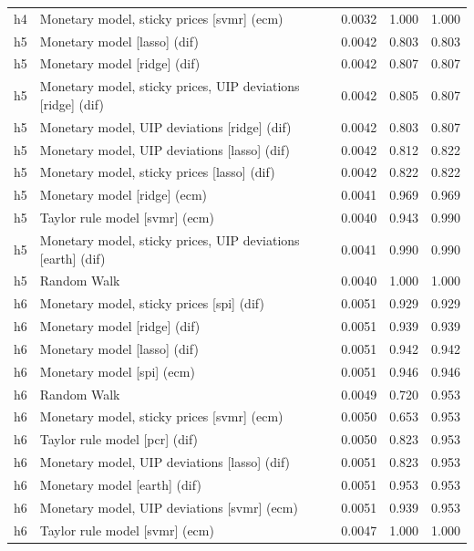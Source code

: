 \begin{ThreePartTable}
\begin{longtable}[t]{cp{5.5cm}ccc}
h4 & \raggedright Monetary model, sticky prices [svmr] (ecm) & 0.0032 & 1.000 & 1.000\\
\addlinespace
h5 & \raggedright Monetary model [lasso] (dif) & 0.0042 & 0.803 & 0.803\\
h5 & \raggedright Monetary model [ridge] (dif) & 0.0042 & 0.807 & 0.807\\
h5 & \raggedright Monetary model, sticky prices, UIP deviations [ridge] (dif) & 0.0042 & 0.805 & 0.807\\
h5 & \raggedright Monetary model, UIP deviations [ridge] (dif) & 0.0042 & 0.803 & 0.807\\
h5 & \raggedright Monetary model, UIP deviations [lasso] (dif) & 0.0042 & 0.812 & 0.822\\
h5 & \raggedright Monetary model, sticky prices [lasso] (dif) & 0.0042 & 0.822 & 0.822\\
h5 & \raggedright Monetary model [ridge] (ecm) & 0.0041 & 0.969 & 0.969\\
h5 & \raggedright Taylor rule model [svmr] (ecm) & 0.0040 & 0.943 & 0.990\\
h5 & \raggedright Monetary model, sticky prices, UIP deviations [earth] (dif) & 0.0041 & 0.990 & 0.990\\
h5 & \raggedright Random Walk & 0.0040 & 1.000 & 1.000\\
\addlinespace
h6 & \raggedright Monetary model, sticky prices [spi] (dif) & 0.0051 & 0.929 & 0.929\\
h6 & \raggedright Monetary model [ridge] (dif) & 0.0051 & 0.939 & 0.939\\
h6 & \raggedright Monetary model [lasso] (dif) & 0.0051 & 0.942 & 0.942\\
h6 & \raggedright Monetary model [spi] (ecm) & 0.0051 & 0.946 & 0.946\\
h6 & \raggedright Random Walk & 0.0049 & 0.720 & 0.953\\
h6 & \raggedright Monetary model, sticky prices [svmr] (ecm) & 0.0050 & 0.653 & 0.953\\
h6 & \raggedright Taylor rule model [pcr] (dif) & 0.0050 & 0.823 & 0.953\\
h6 & \raggedright Monetary model, UIP deviations [lasso] (dif) & 0.0051 & 0.823 & 0.953\\
h6 & \raggedright Monetary model [earth] (dif) & 0.0051 & 0.953 & 0.953\\
h6 & \raggedright Monetary model, UIP deviations [svmr] (ecm) & 0.0051 & 0.939 & 0.953\\
h6 & \raggedright Taylor rule model [svmr] (ecm) & 0.0047 & 1.000 & 1.000\\

\end{longtable}
\end{ThreePartTable}
